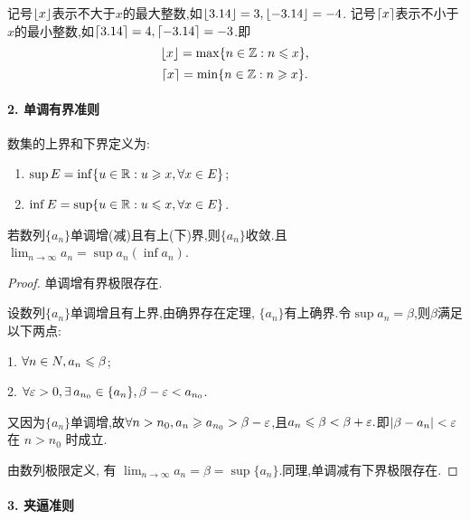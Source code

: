 \begin{notation*}
    记号$\llfloor x \rrfloor$表示不大于$x$的最大整数,如$\llfloor 3.14 \rrfloor = 3, \llfloor -3.14 \rrfloor = -4$. 记号$\llceil x \rrceil$表示不小于$x$的最小整数,如$\llceil 3.14 \rrceil = 4, \llceil -3.14 \rrceil = -3$.即
    $$\llfloor x \rrfloor = \max \{n \in \mathbb{Z}: n \les x\}, $$
    $$\llceil x \rrceil = \min \{n \in \mathbb{Z}: n \ges x\}.$$
\end{notation*}

\paragraph*{2. 单调有界准则}

数集的上界和下界定义为:
\begin{definition} \quad
    \begin{enumerate}
        \item $\sup E = \inf \{ u \in \R: u \ges x, \forall x \in E \}$;
        \item $\inf E = \sup \{ u \in \R: u \les x, \forall x \in E \}$.
    \end{enumerate}
\end{definition}

\begin{theorem}[单调有界极限存在准则]\label{thm:monotone_convergence_theorem}
    若数列$\{a_n\}$单调增(减)且有上(下)界,则$\{a_n\}$收敛.且$\lim_{n \to \infty} a_n=\sup a_n(\inf a_n)$.

\end{theorem}

\begin{proof}单调增有界极限存在.

    设数列$\{a_n\}$单调增且有上界,由确界存在定理, $\{a_n\}$有上确界.令$\sup a_n=\beta$,则$\beta$满足以下两点:

    1. $\forall n\in N, a_n\les \beta$;

    2. $\forall \ve >0, \exists a_{n_0}\in \{a_n\}, \beta-\ve<a_{n_0}$.

    又因为$\{a_n\}$单调增,故$\forall n > n_0, a_n\ges a_{n_0} > \beta-\ve$,且$a_n \les \beta <\beta +\ve.$即$|\beta-a_n|<\ve$ 在 $n>n_0$ 时成立.

    由数列极限定义, 有 $\lim_{n \to \infty} a_n=\beta = \sup \{ a_n \}$.同理,单调减有下界极限存在.
\end{proof}

\paragraph*{3. 夹逼准则}

